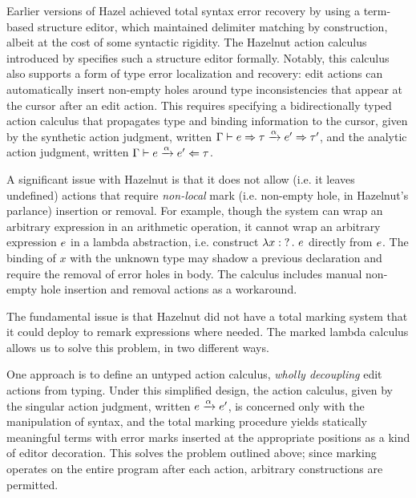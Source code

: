 Earlier versions of Hazel achieved total syntax error recovery by using a term-based structure editor, which maintained delimiter matching by construction, albeit at the cost of some syntactic rigidity. The Hazelnut action calculus introduced by \citet{HazelnutPOPL} specifies such a structure editor formally. Notably, this calculus also supports a form of type error localization and recovery: edit actions can automatically insert non-empty holes around type inconsistencies that appear at the cursor after an edit action. This requires specifying a bidirectionally typed action calculus that propagates type and binding information to the cursor, given by the synthetic action judgment, written
$\Gamma \vdash e \Rightarrow \tau \xrightarrow{\alpha} e' \Rightarrow \tau'$, and the analytic action judgment, written
$\Gamma \vdash e \xrightarrow{\alpha} e' \Leftarrow \tau$.

A significant issue with Hazelnut is that it does not allow (i.e. it leaves undefined) actions that require \emph{non-local} mark (i.e. non-empty hole, in Hazelnut's parlance) insertion or removal. For
example, though the system can wrap an arbitrary expression in an arithmetic operation, it cannot
wrap an arbitrary expression $e$ in a lambda abstraction, i.e. construct
$\lambda x : \operatorname{?}. ~e$ directly from $e$. The binding of $x$ with the unknown type may
shadow a previous declaration and require the removal of error holes in body. The calculus includes manual non-empty hole insertion and removal actions as a workaround.

The fundamental issue is that Hazelnut did not have a total marking system that it could deploy to remark expressions where needed. The marked lambda calculus allows us to solve this problem, in two different ways.

One approach is to define an untyped action calculus, \emph{wholly decoupling} edit actions from typing. Under this simplified design, the action calculus, given by the singular action
judgment, written $e \xrightarrow{\alpha} e'$, is concerned only with the manipulation of
syntax, and the total marking procedure yields statically meaningful terms with error marks inserted at the appropriate positions as a kind of editor decoration. This solves the problem
outlined above; since marking operates on the entire program after each action, arbitrary
constructions are permitted.

